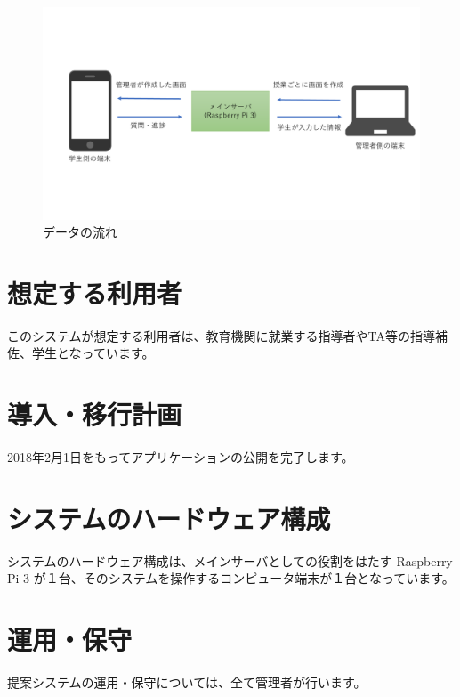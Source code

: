 \documentclass[a4j,titlepage]{ujarticle}
\begin{document}
\begin{figure}[h]
  \begin{center}
    \includegraphics[width=14cm]{data.pdf}
    \caption{データの流れ}
  \end{center}
\end{figure}

\section{想定する利用者}
このシステムが想定する利用者は、教育機関に就業する指導者やTA等の指導補佐、学生となっています。 %

\section{導入・移行計画}
2018年2月1日をもってアプリケーションの公開を完了します。

\section{システムのハードウェア構成}
システムのハードウェア構成は、メインサーバとしての役割をはたす Raspberry Pi 3 が１台、そのシステムを操作するコンピュータ端末が１台となっています。 %

\section{運用・保守}
提案システムの運用・保守については、全て管理者が行います。 %
\end{document}
